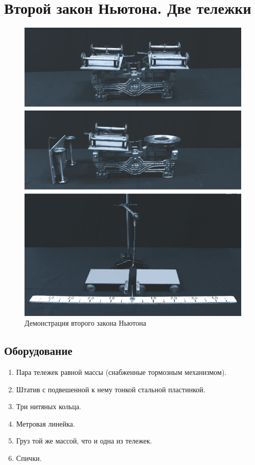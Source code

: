 \documentclass[All.tex]{subfiles}
\begin{document}


	\section{Второй закон Ньютона. Две тележки}


\begin{figure}[H]
	\centering 		
	\includegraphics[width=0.6\linewidth]{newton-1.png}
	\caption{Демонстрация второго закона Ньютона}
	\label{newton-1}
\end{figure}

\subsection*{\textcolor{PineGreen}{Оборудование}}

\begin{enumerate}
	\item Пара тележек равной массы (снабженные тормозным механизмом).
	\item Штатив с подвешенной к нему тонкой стальной пластинкой.
	\item Три нитяных кольца.
	\item Метровая линейка.
	\item Груз той же массой, что и одна из тележек.
	\item Спички.
\end{enumerate}
\end{document}
